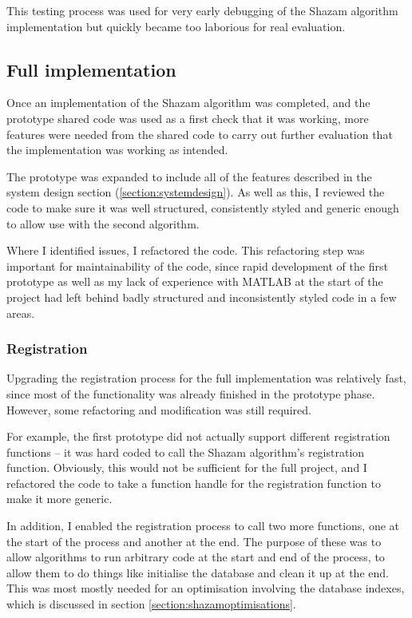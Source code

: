 \documentclass[12pt,a4paper,twoside,openright]{report}
\begin{document}
This testing process was used for very early debugging of the Shazam algorithm implementation but quickly became too laborious for real evaluation.


\subsection{Full implementation}

Once an implementation of the Shazam algorithm was completed, and the prototype shared code was used as a first check that it was working, more features were needed from the shared code to carry out further evaluation that the implementation was working as intended.

The prototype was expanded to include all of the features described in the system design section (\ref{section:systemdesign}). As well as this, I reviewed the code to make sure it was well structured, consistently styled and generic enough to allow use with the second algorithm. 

Where I identified issues, I refactored the code. This refactoring step was important for maintainability of the code, since rapid development of the first prototype as well as my lack of experience with MATLAB at the start of the project had left behind badly structured and inconsistently styled code in a few areas.


\subsubsection{Registration}

Upgrading the registration process for the full implementation was relatively fast, since most of the functionality was already finished in the prototype phase. However, some refactoring and modification was still required.

For example, the first prototype did not actually support different registration functions -- it was hard coded to call the Shazam algorithm's registration function. Obviously, this would not be sufficient for the full project, and I refactored the code to take a function handle for the registration function to make it more generic.

In addition, I enabled the registration process to call two more functions, one at the start of the process and another at the end. The purpose of these was to allow algorithms to run arbitrary code at the start and end of the process, to allow them to do things like initialise the database and clean it up at the end. This was most mostly needed for an optimisation involving the database indexes, which is discussed in section \ref{section:shazamoptimisations}.
\end{document}
